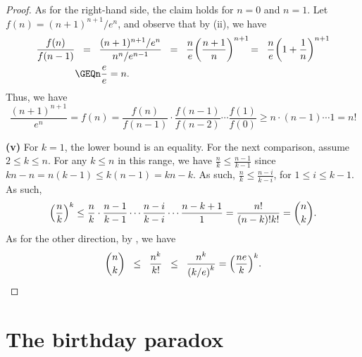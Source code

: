 \begin{proof}
    As for the right-hand side, the claim holds for $n=0$ and
    $n=1$. Let $f(n) = (n+1)^{n+1}/e^n$, and observe that by (ii), we
    have
    \begin{align*}
        \frac{f(n)}{f(n-1)}
        &\EQ%
        \frac{(n+1)^{n+1} / e^n}{n^n / e^{n-1}}
        \EQ%
        \frac{n}{e}\pth{\frac{n+1}{n}}^{n+1}
        \!\!\!\!
        \EQ%
        \frac{n}{e}\pth{1 + \frac{1}{n}}^{n+1}
        \\&%
        \GEQ%
        n \frac{e}{e} = n.
    \end{align*}
    Thus, we have
    \begin{equation*}
        \frac{(n+1)^{n+1}}{e^n}
        =
        f(n)
        =
        \frac{f(n)}{f(n-1)} \cdot
        \frac{f(n-1)}{f(n-2)} \cdots
        \frac{f(1)}{f(0)}
        \geq
        n \cdot (n-1) \cdots 1 = n!
    \end{equation*}


    \medskip%
    \noindent%
    \textbf{(v)} For $k=1$, the lower bound is an equality.  For the next
    comparison, assume $2\leq k\leq n$.  For any $k\leq n$ in this range, we
    have $\frac{n}{k} \leq \frac{n-1}{k-1}$ since
    $kn -n = n(k-1) \leq k(n-1) = kn - k$. As such,
    $\frac{n}{k} \leq \frac{n-i}{k-i}$, for $1 \leq i \leq k-1$. As such,
    \begin{align*}
        \pth{\frac{n}{k}}^k \leq \frac{n}{k} \cdot \frac{n-1}{k-1}
        \cdots \frac{n-i}{k-i} \cdots \frac{n-k+1} {1} =
        \frac{n!}{(n-k)! k!} = \binom{n}{k}.
    \end{align*}
    As for the other direction, by , we have
    \begin{equation*}
        \ds
        \binom{n}{k}
        \LEQ
        \frac{n^k}{k!}
        \LEQ
        \frac{n^k}{\pth{{k}/{e}}^{k}} = \pth{ \frac{n e}{k} }^k.
    \end{equation*}
\end{proof}




\section{The birthday paradox}

